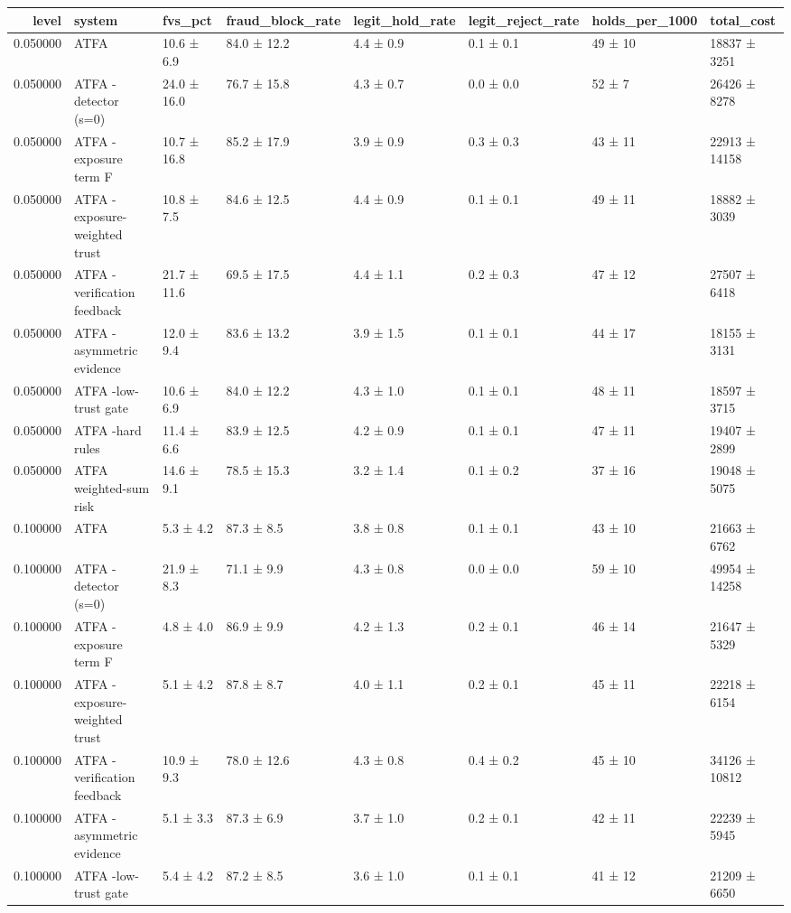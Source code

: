 \begin{tabular}{rlllllll}
\toprule
level & system & fvs\_pct & fraud\_block\_rate & legit\_hold\_rate & legit\_reject\_rate & holds\_per\_1000 & total\_cost \\
\midrule
0.050000 & ATFA & 10.6 ± 6.9 & 84.0 ± 12.2 & 4.4 ± 0.9 & 0.1 ± 0.1 & 49 ± 10 & 18837 ± 3251 \\
0.050000 & ATFA -detector (s=0) & 24.0 ± 16.0 & 76.7 ± 15.8 & 4.3 ± 0.7 & 0.0 ± 0.0 & 52 ± 7 & 26426 ± 8278 \\
0.050000 & ATFA -exposure term F & 10.7 ± 16.8 & 85.2 ± 17.9 & 3.9 ± 0.9 & 0.3 ± 0.3 & 43 ± 11 & 22913 ± 14158 \\
0.050000 & ATFA -exposure-weighted trust & 10.8 ± 7.5 & 84.6 ± 12.5 & 4.4 ± 0.9 & 0.1 ± 0.1 & 49 ± 11 & 18882 ± 3039 \\
0.050000 & ATFA -verification feedback & 21.7 ± 11.6 & 69.5 ± 17.5 & 4.4 ± 1.1 & 0.2 ± 0.3 & 47 ± 12 & 27507 ± 6418 \\
0.050000 & ATFA -asymmetric evidence & 12.0 ± 9.4 & 83.6 ± 13.2 & 3.9 ± 1.5 & 0.1 ± 0.1 & 44 ± 17 & 18155 ± 3131 \\
0.050000 & ATFA -low-trust gate & 10.6 ± 6.9 & 84.0 ± 12.2 & 4.3 ± 1.0 & 0.1 ± 0.1 & 48 ± 11 & 18597 ± 3715 \\
0.050000 & ATFA -hard rules & 11.4 ± 6.6 & 83.9 ± 12.5 & 4.2 ± 0.9 & 0.1 ± 0.1 & 47 ± 11 & 19407 ± 2899 \\
0.050000 & ATFA weighted-sum risk & 14.6 ± 9.1 & 78.5 ± 15.3 & 3.2 ± 1.4 & 0.1 ± 0.2 & 37 ± 16 & 19048 ± 5075 \\
0.100000 & ATFA & 5.3 ± 4.2 & 87.3 ± 8.5 & 3.8 ± 0.8 & 0.1 ± 0.1 & 43 ± 10 & 21663 ± 6762 \\
0.100000 & ATFA -detector (s=0) & 21.9 ± 8.3 & 71.1 ± 9.9 & 4.3 ± 0.8 & 0.0 ± 0.0 & 59 ± 10 & 49954 ± 14258 \\
0.100000 & ATFA -exposure term F & 4.8 ± 4.0 & 86.9 ± 9.9 & 4.2 ± 1.3 & 0.2 ± 0.1 & 46 ± 14 & 21647 ± 5329 \\
0.100000 & ATFA -exposure-weighted trust & 5.1 ± 4.2 & 87.8 ± 8.7 & 4.0 ± 1.1 & 0.2 ± 0.1 & 45 ± 11 & 22218 ± 6154 \\
0.100000 & ATFA -verification feedback & 10.9 ± 9.3 & 78.0 ± 12.6 & 4.3 ± 0.8 & 0.4 ± 0.2 & 45 ± 10 & 34126 ± 10812 \\
0.100000 & ATFA -asymmetric evidence & 5.1 ± 3.3 & 87.3 ± 6.9 & 3.7 ± 1.0 & 0.2 ± 0.1 & 42 ± 11 & 22239 ± 5945 \\
0.100000 & ATFA -low-trust gate & 5.4 ± 4.2 & 87.2 ± 8.5 & 3.6 ± 1.0 & 0.1 ± 0.1 & 41 ± 12 & 21209 ± 6650 \\

\end{tabular}
